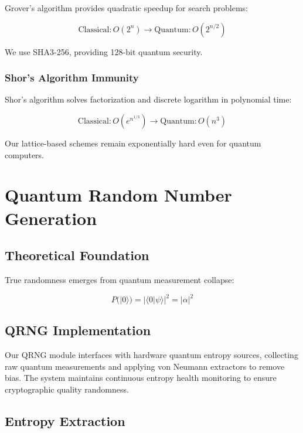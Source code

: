 \documentclass[11pt,a4paper]{article}
\begin{document}
Grover's algorithm provides quadratic speedup for search problems:

\begin{equation}
\text{Classical}: O(2^n) \rightarrow \text{Quantum}: O(2^{n/2})
\end{equation}

We use SHA3-256, providing 128-bit quantum security.

\subsubsection{Shor's Algorithm Immunity}

Shor's algorithm solves factorization and discrete logarithm in polynomial time:

\begin{equation}
\text{Classical}: O(e^{n^{1/3}}) \rightarrow \text{Quantum}: O(n^3)
\end{equation}

Our lattice-based schemes remain exponentially hard even for quantum computers.

\section{Quantum Random Number Generation}

\subsection{Theoretical Foundation}

True randomness emerges from quantum measurement collapse:

\begin{equation}
P(|0\rangle) = |\langle 0|\psi\rangle|^2 = |\alpha|^2
\end{equation}

\subsection{QRNG Implementation}

Our QRNG module interfaces with hardware quantum entropy sources, collecting raw quantum measurements and applying von Neumann extractors to remove bias. The system maintains continuous entropy health monitoring to ensure cryptographic quality randomness.

\subsection{Entropy Extraction}
\end{document}
